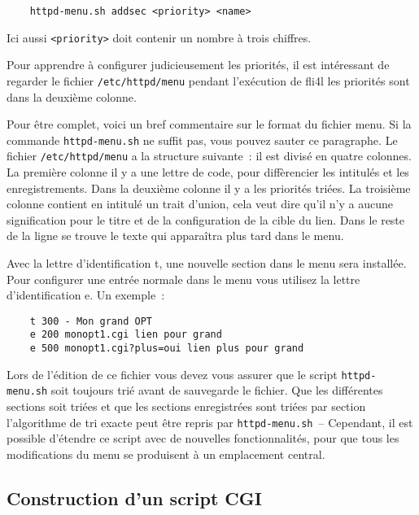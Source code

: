 \begin{example}
\begin{verbatim}
    httpd-menu.sh addsec <priority> <name>
\end{verbatim}
\end{example}

Ici aussi \texttt{<priority>} doit contenir un nombre à trois chiffres.

Pour apprendre à configurer judicieusement les priorités, il est
intéressant de regarder le fichier \texttt{/etc/httpd/menu} pendant l'exécution
de fli4l les priorités sont dans la deuxième colonne.

Pour être complet, voici un bref commentaire sur le format du fichier menu.
Si la commande \texttt{httpd-menu.sh} ne suffit pas, vous pouvez sauter ce paragraphe.
Le fichier \texttt{/etc/httpd/menu} a la structure suivante~: il est divisé en quatre
colonnes. La première colonne il y a une lettre de code, pour diffèrencier les
intitulés et les enregistrements. Dans la deuxième colonne il y a les priorités triées.
La troisième colonne contient en intitulé un trait d'union, cela veut dire qu'il n'y a
aucune signification pour le titre et de la configuration de la cible du lien. Dans
le reste de la ligne se trouve le texte qui apparaîtra plus tard dans le menu.

Avec la lettre d'identification \og{}t\fg{}, une nouvelle section dans le menu sera installée.
Pour configurer une entrée normale dans le menu vous utilisez la lettre d'identification \og{}e\fg{}.
Un exemple~:

\begin{example}
\begin{verbatim}
    t 300 - Mon grand OPT
    e 200 monopt1.cgi lien pour grand
    e 500 monopt1.cgi?plus=oui lien plus pour grand
\end{verbatim}
\end{example}

Lors de l'édition de ce fichier vous devez vous assurer que le script 
\texttt{httpd-menu.sh} soit toujours trié avant de sauvegarde le fichier. Que les
différentes sections soit triées et que les sections enregistrées sont triées
par section l'algorithme de tri exacte peut être repris par \texttt{httpd-menu.sh}~--
Cependant, il est possible d'étendre ce script avec de nouvelles fonctionnalités,
pour que tous les modifications du menu se produisent à un emplacement central.


\subsection{Construction d'un script CGI}


